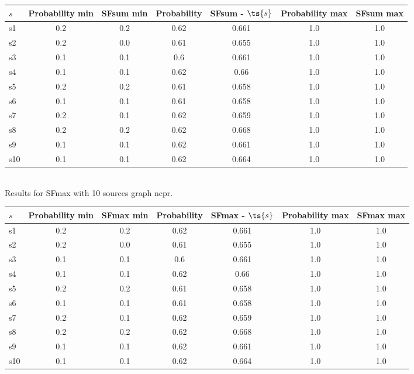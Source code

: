 \documentclass{article}
\begin{document}
\noindent\begin{tabular}{|l|c|c|c|c|c|c|}
\hline
$s$& Probability min & SFsum min & Probability & SFsum - $\ts{s}$ & Probability max & SFsum max\\
\hline
s1 &0.2 & 0.2 & 0.62 & 0.661 & 1.0 & 1.0\\
\hline
s2 &0.2 & 0.0 & 0.61 & 0.655 & 1.0 & 1.0\\
\hline
s3 &0.1 & 0.1 & 0.6 & 0.661 & 1.0 & 1.0\\
\hline
s4 &0.1 & 0.1 & 0.62 & 0.66 & 1.0 & 1.0\\
\hline
s5 &0.2 & 0.2 & 0.61 & 0.658 & 1.0 & 1.0\\
\hline
s6 &0.1 & 0.1 & 0.61 & 0.658 & 1.0 & 1.0\\
\hline
s7 &0.2 & 0.1 & 0.62 & 0.659 & 1.0 & 1.0\\
\hline
s8 &0.2 & 0.2 & 0.62 & 0.668 & 1.0 & 1.0\\
\hline
s9 &0.1 & 0.1 & 0.62 & 0.661 & 1.0 & 1.0\\
\hline
s10 &0.1 & 0.1 & 0.62 & 0.664 & 1.0 & 1.0\\
\hline
\end{tabular}\\

\noindent Results for SFmax with 10 sources graph ncpr.

\noindent\begin{tabular}{|l|c|c|c|c|c|c|}
\hline
$s$& Probability min & SFmax min & Probability & SFmax - $\ts{s}$ & Probability max & SFmax max\\
\hline
s1 &0.2 & 0.2 & 0.62 & 0.661 & 1.0 & 1.0\\
\hline
s2 &0.2 & 0.0 & 0.61 & 0.655 & 1.0 & 1.0\\
\hline
s3 &0.1 & 0.1 & 0.6 & 0.661 & 1.0 & 1.0\\
\hline
s4 &0.1 & 0.1 & 0.62 & 0.66 & 1.0 & 1.0\\
\hline
s5 &0.2 & 0.2 & 0.61 & 0.658 & 1.0 & 1.0\\
\hline
s6 &0.1 & 0.1 & 0.61 & 0.658 & 1.0 & 1.0\\
\hline
s7 &0.2 & 0.1 & 0.62 & 0.659 & 1.0 & 1.0\\
\hline
s8 &0.2 & 0.2 & 0.62 & 0.668 & 1.0 & 1.0\\
\hline
s9 &0.1 & 0.1 & 0.62 & 0.661 & 1.0 & 1.0\\
\hline
s10 &0.1 & 0.1 & 0.62 & 0.664 & 1.0 & 1.0\\
\hline
\end{tabular}\\
\end{document}
